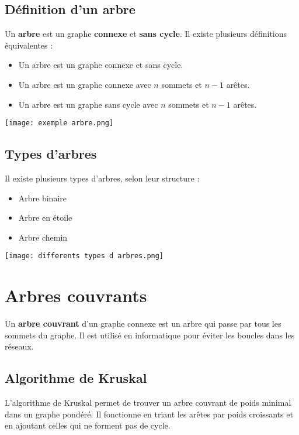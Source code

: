 \documentclass[10pt,a4paper]{article}
\begin{document}
\subsection*{Définition d'un arbre}

Un \textbf{arbre} est un graphe \textbf{connexe} et \textbf{sans cycle}. Il existe plusieurs définitions équivalentes :
\begin{itemize}
    \item Un arbre est un graphe connexe et sans cycle.
    \item Un arbre est un graphe connexe avec \( n \) sommets et \( n-1 \) arêtes.
    \item Un arbre est un graphe sans cycle avec \( n \) sommets et \( n-1 \) arêtes.
\end{itemize}

\texttt{[image: exemple arbre.png]}

\subsection*{Types d'arbres}

Il existe plusieurs types d'arbres, selon leur structure :
\begin{itemize}
    \item Arbre binaire
    \item Arbre en étoile
    \item Arbre chemin
\end{itemize}
\texttt{[image: differents types d arbres.png]}

\section*{Arbres couvrants}

Un \textbf{arbre couvrant} d'un graphe connexe est un arbre qui passe par tous les sommets du graphe. Il est utilisé en informatique pour éviter les boucles dans les réseaux.

\subsection*{Algorithme de Kruskal}

L'algorithme de Kruskal permet de trouver un arbre couvrant de poids minimal dans un graphe pondéré. Il fonctionne en triant les arêtes par poids croissants et en ajoutant celles qui ne forment pas de cycle.
\end{document}
